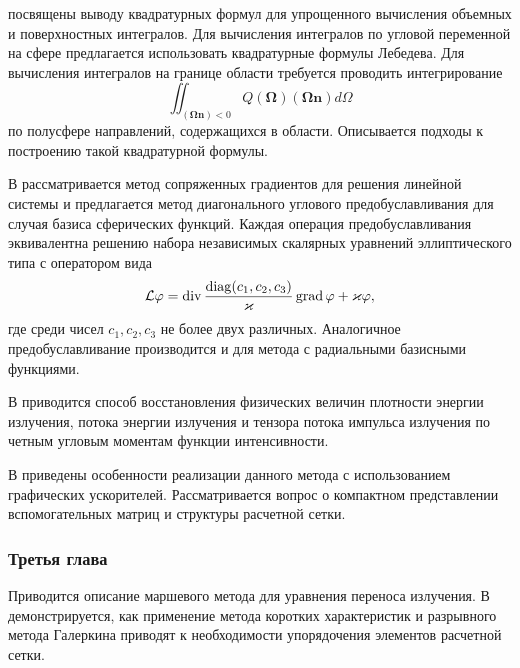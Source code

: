  посвящены выводу квадратурных формул для упрощенного вычисления объемных и поверхностных интегралов. Для вычисления интегралов по угловой переменной на сфере предлагается использовать квадратурные формулы Лебедева. Для вычисления интегралов на границе области требуется проводить интегрирование
\[
\iint_{(\boldsymbol \Omega \mathbf n) < 0}  Q(\boldsymbol \Omega) (\boldsymbol \Omega \mathbf n) d\Omega
\]
по полусфере направлений, содержащихся в области. Описывается подходы к построению такой квадратурной формулы. 

В  рассматривается метод сопряженных градиентов для решения линейной системы и предлагается метод диагонального углового предобуславливания для случая базиса сферических функций. Каждая операция предобуславливания эквивалентна решению набора независимых скалярных уравнений эллиптического типа с оператором вида
\[
\mathcal{L}\varphi = \operatorname{div} \frac{\operatorname{diag}(c_1, c_2, c_3)}{\varkappa}\operatorname{grad} \varphi + \varkappa \varphi,
\]
где среди чисел $c_1, c_2, c_3$ не более двух различных. Аналогичное предобуславливание производится и для метода с радиальными базисными функциями.

В  приводится способ восстановления физических величин плотности энергии излучения, потока энергии излучения и тензора потока импульса излучения по четным угловым моментам функции интенсивности.

В  приведены особенности реализации данного метода с использованием графических ускорителей. Рассматривается вопрос о компактном представлении вспомогательных матриц и структуры расчетной сетки.


\subsubsection*{Третья глава}
Приводится описание маршевого метода для уравнения переноса излучения. В  демонстрируется, как применение метода коротких характеристик и разрывного метода Галеркина приводят к необходимости упорядочения элементов расчетной сетки.

